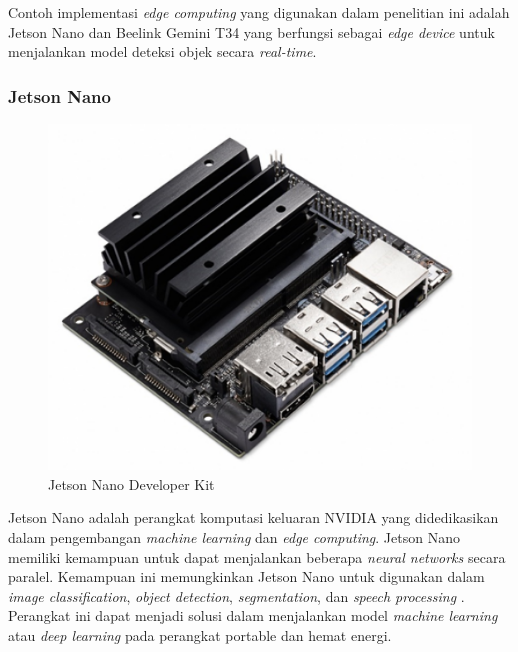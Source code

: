 Contoh implementasi \emph{edge computing} yang digunakan dalam penelitian ini adalah Jetson Nano dan Beelink Gemini T34 yang berfungsi sebagai \emph{edge device} untuk menjalankan model deteksi objek secara \emph{real-time}.

\subsubsection{Jetson Nano}

 \begin{figure}[htbp]
  \centering
  \includegraphics[scale=0.5]{gambar/bab2-jetson-nano.png}
  \caption{Jetson Nano Developer Kit}
  \label{fig:jetsonnano}
\end{figure}

Jetson Nano adalah perangkat komputasi keluaran NVIDIA yang didedikasikan dalam pengembangan \textit{machine learning} dan \emph{edge computing}. Jetson Nano memiliki kemampuan untuk dapat menjalankan beberapa \emph{neural networks} secara paralel. Kemampuan ini memungkinkan Jetson Nano untuk digunakan dalam \textit{image classification}, \textit{object detection}, \textit{segmentation}, dan \textit{speech processing} \parencite{nvidiaJetsonNano}. Perangkat ini dapat menjadi solusi dalam menjalankan model \textit{machine learning} atau \textit{deep learning} pada perangkat portable dan hemat energi. 


